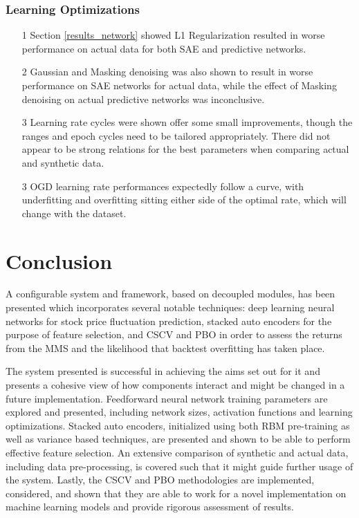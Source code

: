 \documentclass[a4paper,11pt,oneside]{article}
\theoremstyle{plain}
\theoremstyle{definition}
\begin{document}
\subsubsection{Learning Optimizations}
\begin{itemize}
	\item[1] Section \ref{results_network} showed L1 Regularization resulted in worse performance on actual data for both SAE and predictive networks.
	\item[2] Gaussian and Masking denoising was also shown to result in worse performance on SAE networks for actual data, while the effect of Masking denoising on actual predictive networks was inconclusive.
	\item[3] Learning rate cycles were shown offer some small improvements, though the ranges and epoch cycles need to be tailored appropriately. There did not appear to be strong relations for the best parameters when comparing actual and synthetic data.
	\item[3] OGD learning rate performances expectedly follow a curve, with underfitting and overfitting sitting either side of the optimal rate, which will change with the dataset.
\end{itemize}


\newpage
\section{Conclusion}\label{Conclusion}

A configurable system and framework, based on decoupled modules, has been presented which incorporates several notable techniques: deep learning neural networks for stock price fluctuation prediction, stacked auto encoders for the purpose of feature selection, and CSCV and PBO in order to assess the returns from the MMS and the likelihood that backtest overfitting has taken place. \newline 

The system presented is successful in achieving the aims set out for it and presents a cohesive view of how components interact and might be changed in a future implementation. Feedforward neural network training parameters are explored and presented, including network sizes, activation functions and learning optimizations. Stacked auto encoders, initialized using both RBM pre-training as well as variance based techniques, are presented and shown to be able to perform effective feature selection. An extensive comparison of synthetic and actual data, including data pre-processing, is covered such that it might guide further usage of the system. Lastly, the CSCV and PBO methodologies are implemented, considered, and shown that they are able to work for a novel implementation on machine learning models and provide rigorous assessment of results. \newline 
\end{document}
